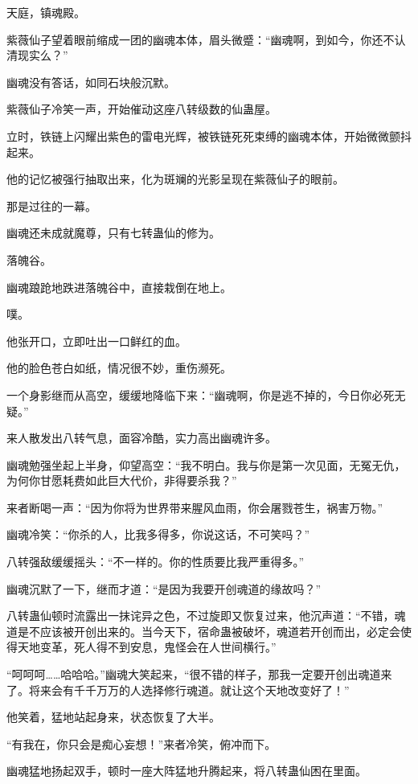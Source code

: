 
\begin{this_body}

天庭，镇魂殿。

紫薇仙子望着眼前缩成一团的幽魂本体，眉头微蹙：“幽魂啊，到如今，你还不认清现实么？”

幽魂没有答话，如同石块般沉默。

紫薇仙子冷笑一声，开始催动这座八转级数的仙蛊屋。

立时，铁链上闪耀出紫色的雷电光辉，被铁链死死束缚的幽魂本体，开始微微颤抖起来。

他的记忆被强行抽取出来，化为斑斓的光影呈现在紫薇仙子的眼前。

那是过往的一幕。

幽魂还未成就魔尊，只有七转蛊仙的修为。

落魄谷。

幽魂踉跄地跌进落魄谷中，直接栽倒在地上。

噗。

他张开口，立即吐出一口鲜红的血。

他的脸色苍白如纸，情况很不妙，重伤濒死。

一个身影继而从高空，缓缓地降临下来：“幽魂啊，你是逃不掉的，今日你必死无疑。”

来人散发出八转气息，面容冷酷，实力高出幽魂许多。

幽魂勉强坐起上半身，仰望高空：“我不明白。我与你是第一次见面，无冤无仇，为何你甘愿耗费如此巨大代价，非得要杀我？”

来者断喝一声：“因为你将为世界带来腥风血雨，你会屠戮苍生，祸害万物。”

幽魂冷笑：“你杀的人，比我多得多，你说这话，不可笑吗？”

八转强敌缓缓摇头：“不一样的。你的性质要比我严重得多。”

幽魂沉默了一下，继而才道：“是因为我要开创魂道的缘故吗？”

八转蛊仙顿时流露出一抹诧异之色，不过旋即又恢复过来，他沉声道：“不错，魂道是不应该被开创出来的。当今天下，宿命蛊被破坏，魂道若开创而出，必定会使得天地变革，死人得不到安息，鬼怪会在人世间横行。”

“呵呵呵……哈哈哈。”幽魂大笑起来，“很不错的样子，那我一定要开创出魂道来了。将来会有千千万万的人选择修行魂道。就让这个天地改变好了！”

他笑着，猛地站起身来，状态恢复了大半。

“有我在，你只会是痴心妄想！”来者冷笑，俯冲而下。

幽魂猛地扬起双手，顿时一座大阵猛地升腾起来，将八转蛊仙困在里面。


\end{this_body}
